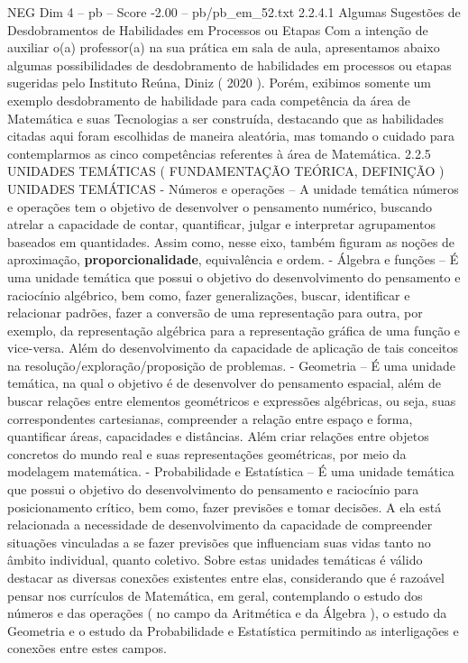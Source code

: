 \begin{textsample}{NEG Dim 4 – pb – Score -2.00 – pb/pb\_em\_52.txt}  \label{ex:f4_neg_027}
2.2.4.1 Algumas Sugestões de Desdobramentos de Habilidades em Processos ou Etapas Com a intenção de auxiliar o(a) professor(a) na sua prática em sala de aula, apresentamos abaixo algumas possibilidades de desdobramento de habilidades em processos ou etapas sugeridas pelo Instituto Reúna, Diniz ( 2020 ).
Porém, exibimos somente um exemplo desdobramento de habilidade para cada competência da área de Matemática e suas Tecnologias a ser construída, destacando que as habilidades citadas aqui foram escolhidas de maneira aleatória, mas tomando o cuidado para contemplarmos as cinco competências referentes à área de Matemática. 2.2.5 UNIDADES TEMÁTICAS ( FUNDAMENTAÇÃO TEÓRICA, DEFINIÇÃO ) UNIDADES TEMÁTICAS - Números e operações – A unidade temática números e operações tem o objetivo de desenvolver o pensamento numérico, buscando atrelar a capacidade de contar, quantificar, julgar e interpretar agrupamentos baseados em quantidades.
Assim como, nesse eixo, também figuram as noções de aproximação, \textbf{proporcionalidade}, equivalência e ordem. - Álgebra e funções – É uma unidade temática que possui o objetivo do desenvolvimento do pensamento e raciocínio algébrico, bem como, fazer generalizações, buscar, identificar e relacionar padrões, fazer a conversão de uma representação para outra, por exemplo, da representação algébrica para a representação gráfica de uma função e vice-versa.
Além do desenvolvimento da capacidade de aplicação de tais conceitos na resolução/exploração/proposição de problemas. - Geometria – É uma unidade temática, na qual o objetivo é de desenvolver do pensamento espacial, além de buscar relações entre elementos geométricos e expressões algébricas, ou seja, suas correspondentes cartesianas, compreender a relação entre espaço e forma, quantificar áreas, capacidades e distâncias.
Além criar relações entre objetos concretos do mundo real e suas representações geométricas, por meio da modelagem matemática. - Probabilidade e Estatística – É uma unidade temática que possui o objetivo do desenvolvimento do pensamento e raciocínio para posicionamento crítico, bem como, fazer previsões e tomar decisões.
A ela está relacionada a necessidade de desenvolvimento da capacidade de compreender situações vinculadas a se fazer previsões que influenciam suas vidas tanto no âmbito individual, quanto coletivo.
Sobre estas unidades temáticas é válido destacar as diversas conexões existentes entre elas, considerando que é razoável pensar nos currículos de Matemática, em geral, contemplando o estudo dos números e das operações ( no campo da Aritmética e da Álgebra ), o estudo da Geometria e o estudo da Probabilidade e Estatística permitindo as interligações e conexões entre estes campos.

\end{textsample}
